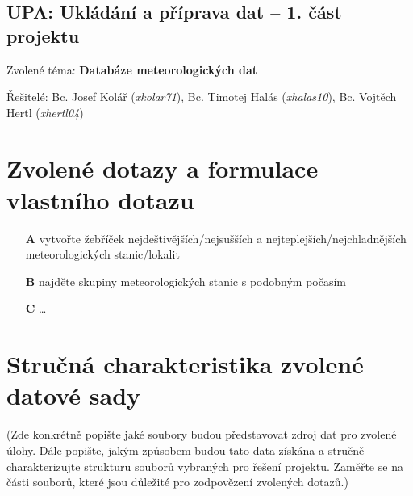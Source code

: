 \documentclass[11pt,a4paper,titlepage]{extarticle}
\begin{document}
\pagestyle{empty}
\begin{center}
	\section*{UPA: Ukládání a příprava dat -- 1. část projektu}
\end{center}

\large{Zvolené téma: \textbf{Databáze meteorologických dat}}

\large{
	Řešitelé:
	Bc. Josef Kolář (\textit{xkolar71}),
	Bc. Timotej Halás (\textit{xhalas10}),
	Bc. Vojtěch Hertl (\textit{xhertl04})
}

\section{Zvolené dotazy a formulace vlastního dotazu}

\begin{itemize}
	\item[\textbf{A}] vytvořte žebříček nejdeštivějších/nejsušších a nejteplejších/nejchladnějších meteorologických stanic/lokalit
	\item[\textbf{B}] najděte skupiny meteorologických stanic s podobným počasím
	\item[\textbf{C}] \ldots
\end{itemize}
\section{Stručná charakteristika zvolené datové sady}
(Zde konkrétně popište jaké soubory budou představovat zdroj dat pro zvolené úlohy. Dále popište, jakým způsobem budou tato data získána a stručně charakterizujte strukturu souborů vybraných pro řešení projektu. Zaměřte se na části souborů, které jsou důležité pro zodpovězení zvolených dotazů.)
\end{document}
